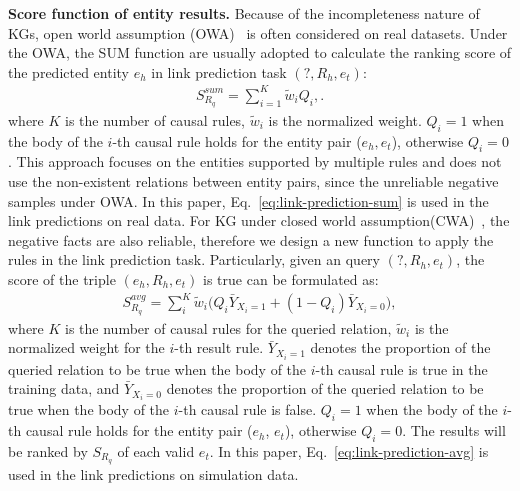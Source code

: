 \noindent
\textbf{Score function of entity results.}
Because of the incompleteness nature of KGs, open world assumption (OWA)~\cite{ji2021survey} is often considered on real datasets.
Under the OWA, the SUM function are usually adopted to calculate the ranking score of the predicted entity $e_h$ in link prediction task $(?,R_h,e_t)$:
\begin{equation}
\label{eq:link-prediction-sum}
\begin{aligned}
S_{R_q}^{sum}=\sum_{i=1}^K \tilde{w}_i Q_{i},.
\end{aligned}
\end{equation}
where $K$ is the number of causal rules, $\tilde{w}_i$ is the normalized weight.
$Q_i=1$ when the body of the $i$-th causal rule holds for the entity pair ($e_h, e_t$), otherwise $Q_i=0$.
This approach focuses on the entities supported by multiple rules and does not use the non-existent relations between entity pairs, since the unreliable negative samples under OWA.
In this paper, Eq.~\ref{eq:link-prediction-sum} is used in the link predictions on real data.
For KG under closed world assumption(CWA)~\cite{ji2021survey}, the negative facts are also reliable, therefore we design a new function to apply the rules in the link prediction task.
Particularly, given an query $(?,R_h,e_t)$, the score of the triple $(e_h,R_h,e_t)$ is true can be formulated as:
\begin{equation}
\label{eq:link-prediction-avg}
\begin{aligned}
S_{R_q}^{avg} = \sum_i^K \tilde{w}_i \big(Q_i \bar{Y}_{X_i=1} + (1-Q_i) \bar{Y}_{X_i=0}\big),
\end{aligned}
\end{equation}
where $K$ is the number of causal rules for the queried relation, $\tilde{w}_i$ is the normalized weight for the $i$-th result rule.
$\bar{Y}_{X_i=1}$ denotes the proportion of the queried relation to be true when the body of the $i$-th causal rule is true in the training data, and $\bar{Y}_{X_i=0}$ denotes the proportion of the queried relation to be true when the body of the $i$-th causal rule is false.
$Q_i=1$ when the body of the $i$-th causal rule holds for the entity pair ($e_h$, $e_t$), otherwise $Q_i=0$.
The results will be ranked by $S_{R_q}$ of each valid $e_t$.
In this paper, Eq.~\ref{eq:link-prediction-avg} is used in the link predictions on simulation data.



